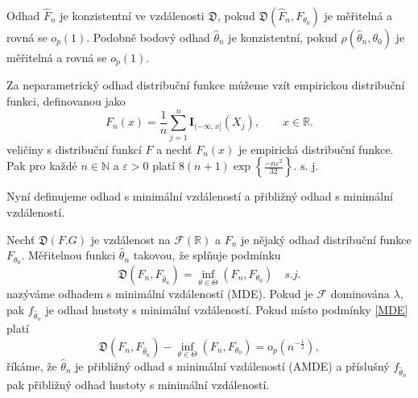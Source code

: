 \begin{definition}
Odhad $\hat{F}_n$ je konzistentní ve vzdálenosti $\mathfrak{D}$, pokud 
$\mathfrak{D}(\hat{F}_n, F_{\theta_0})$ je měřitelná a rovná se $o_p (1)$. 
Podobně bodový odhad $\hat{\theta}_n$ je konzistentní, pokud 
$\rho(\hat{\theta}_n,\theta_0)$ je měřitelná a rovná se $o_p (1)$. 
\end{definition}

\noindent Za neparametrický odhad distribuční funkce můžeme vzít empirickou 
distribuční funkci, definovanou jako
\begin{equation}
F_n(x)=\frac{1}{n}\sum_{j=1}^n \textbf{I}_{(-\infty,x]}(X_j), \qquad 
x\in\mathbb{R}.
\end{equation}
%
veličiny s distribuční funkcí $F$ a nechť $F_n(x)$ je empirická distribuční 
funkce. Pak pro každé $n\in \mathbb{N}$ a $\varepsilon>0$ platí
%
$8(n+1)\exp{\left\{ \frac{-n{\varepsilon}^2}{32}\right\}}.$
$\text{s. j.}$

\noindent Nyní definujeme odhad s minimální vzdáleností a přibližný odhad s 
minimální vzdáleností.

\begin{definition}\label{def-mde}
	Nech\v{t} $\mathfrak{D}(F.G)$ je vzdálenost na $\mathcal{F}(\mathbb{R})$ a 
$F_n$ je nějaký odhad distribuční funkce $F_{\theta_0}$. Měřitelnou funkci 
$\hat{\theta}_n$ takovou, že spl\v{n}uje podmínku
	\begin{equation}
		\mathfrak{D}(F_n, F_{\hat{\theta}_n}) = \inf_{\theta \in \Theta}(F_n, 
F_{\theta_0}) \quad s.j.
		\label{MDE}
	\end{equation}
	nazýváme odhadem s minimální vzdáleností (MDE). Pokud je $\mathcal{F}$ 
dominována $\lambda$, pak $f_{\hat{\theta}_n}$  je odhad hustoty s minimální 
vzdáleností. Pokud místo podmínky \eqref{MDE} platí 
	\begin{equation}
		\mathfrak{D}(F_n, F_{\hat{\theta}_n}) - \inf_{\theta \in \Theta}(F_n, 
F_{\theta_0}) = o_p(n^{-\frac{1}{2}}), 
	\end{equation}
	říkáme, že $\hat{\theta}_n$ je přibližný odhad s minimální vzdáleností (AMDE) 
a příslušný  $f_{\hat{\theta}_n}$ pak přibližný odhad hustoty s minimální 
vzdáleností.
\end{definition}


